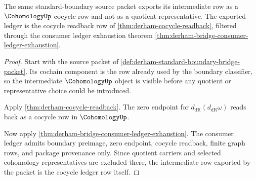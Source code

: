 \begin{theorem}
\label{thm:derham-root-cocycle-ledger-threshold}
The same standard-boundary source packet exports its intermediate row as a
$\CohomologyUp$ cocycle row and not as a quotient representative. The exported
ledger is the cocycle readback row of \autoref{thm:derham-cocycle-readback},
filtered through the consumer ledger exhaustion theorem
\autoref{thm:derham-bridge-consumer-ledger-exhaustion}.
\end{theorem}
\begin{proof}
Start with the source packet of
\autoref{def:derham-standard-boundary-bridge-packet}. Its cochain component is
the row already used by the boundary classifier, so the intermediate
$\CohomologyUp$ object is visible before any quotient or representative choice
could be introduced.

Apply \autoref{thm:derham-cocycle-readback}. The zero endpoint for
$d_{\mathrm{dR}}(d_{\mathrm{dR}}\omega)$ reads back as a cocycle row in
$\CohomologyUp$.

Now apply \autoref{thm:derham-bridge-consumer-ledger-exhaustion}. The consumer
ledger admits boundary preimage, zero endpoint, cocycle readback, finite graph
rows, and package provenance only. Since quotient carriers and selected
cohomology representatives are excluded there, the intermediate row exported
by the packet is the cocycle ledger row itself.
\end{proof}

